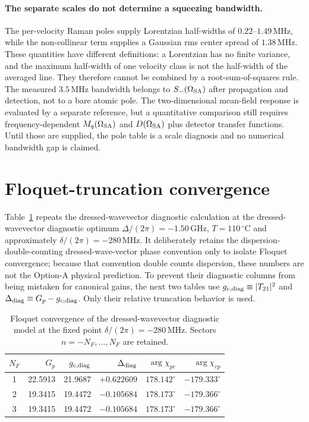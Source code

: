 \documentclass[11pt,a4paper]{article}
\newcommand{\GHz}{\,\mathrm{GHz}}
\newcommand{\MHz}{\,\mathrm{MHz}}
\newcommand{\degC}{\,^{\circ}\mathrm C}
\begin{document}
\paragraph{The separate scales do not determine a squeezing bandwidth.}
The per-velocity Raman poles supply Lorentzian half-widths of
$0.22$--$1.49\MHz$, while the non-collinear term supplies a Gaussian rms center
spread of $1.38\MHz$. These quantities have different definitions: a
Lorentzian has no finite variance, and the maximum half-width of one velocity
class is not the half-width of the averaged line. They therefore cannot be
combined by a root-sum-of-squares rule. The measured
$3.5\MHz$ bandwidth belongs to $S_-(\Omega_{\rm SA})$ after propagation and
detection, not to a bare atomic pole. The two-dimensional mean-field response
is evaluated by a separate reference, but a quantitative comparison still
requires frequency-dependent $M_q(\Omega_{\rm SA})$ and
$D(\Omega_{\rm SA})$ plus detector transfer functions. Until those are
supplied, the pole table is a scale diagnosis and no numerical bandwidth gap
is claimed.

\section{Floquet-truncation convergence}
\label{sec:floquet-convergence}

Table~\ref{tab:floquet-convergence} repeats the dressed-wavevector diagnostic calculation at
the dressed-wavevector diagnostic optimum
$\Delta/(2\pi)=-1.50\GHz$, $T=110\degC$ and approximately
$\delta/(2\pi)=-280\MHz$. It deliberately retains the dispersion-double-counting
dressed-wave-vector phase convention only to isolate Floquet convergence;
because that convention double counts dispersion, these numbers are not the
Option-A physical prediction. To prevent their diagnostic columns from being
mistaken for canonical gains, the next two tables use
$g_{c,{\rm diag}}\equiv|T_{21}|^2$ and
$\Delta_{\rm diag}\equiv G_p-g_{c,{\rm diag}}$. Only
their relative truncation behavior is used.

\begin{table}[ht]
\centering
\caption{Floquet convergence of the dressed-wavevector diagnostic model at the fixed point
$\delta/(2\pi)=-280\MHz$. Sectors $n=-N_F,\ldots,N_F$ are retained.}
\label{tab:floquet-convergence}
\small
\begin{tabular}{c r r r r r}
\toprule
$N_F$ & $G_p$ & $g_{c,{\rm diag}}$ & $\Delta_{\rm diag}$ &
$\arg\chi_{pc}$ & $\arg\chi_{cp}$\\
\midrule
1 & 22.5913 & 21.9687 & $+0.622609$ &
$178.142^\circ$ & $-179.333^\circ$\\
2 & 19.3415 & 19.4472 & $-0.105684$ &
$178.173^\circ$ & $-179.366^\circ$\\
3 & 19.3415 & 19.4472 & $-0.105684$ &
$178.173^\circ$ & $-179.366^\circ$\\
\bottomrule
\end{tabular}
\end{table}
\end{document}
